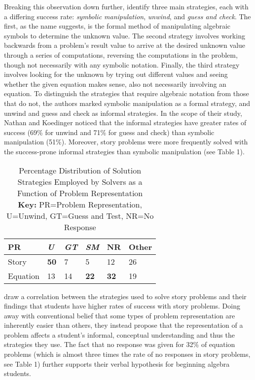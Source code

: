 \documentclass[10pt,letterpaper]{article}
\begin{document}
	Breaking this observation down further,  identify three main strategies, each with a differing success rate: \textit{symbolic manipulation}, \textit{unwind}, and \textit{guess and check}. The first, as the name suggests, is the formal method of manipulating algebraic symbols to determine the unknown value. The second strategy involves working backwards from a problem's result value to arrive at the desired unknown value through a series of computations, reversing the computations in the problem, though not necessarily with any symbolic notation. Finally, the third strategy involves looking for the unknown by trying out different values and seeing whether the given equation makes sense, also not necessarily involving an equation. To distinguish the strategies that require algebraic notation from those that do not, the authors marked symbolic manipulation as a formal strategy, and unwind and guess and check as informal strategies. In the scope of their study, Nathan and Koedinger noticed that the informal strategies have greater rates of success (69\% for unwind and 71\% for guess and check) than symbolic manipulation (51\%). Moreover, story problems were more frequently solved with the success-prone informal strategies than symbolic manipulation (see Table 1). %
	\begin{table}[!ht]
		\begin{center} 
			\label{strategies_employed} 
			\vskip 0.12in
			\begin{tabular}{llllll} 
				\hline
				PR    &  \textit{U} & \textit{GT} & \textit{SM} & NR & Other \\
				\hline
				Story        &   \textbf{50} & 7 & 5 & 12 & 26\\
				Equation   &   13 & 14 & \textbf{22} & \textbf{32} & 19 \\
				\hline
			\end{tabular} 
			\caption{Percentage Distribution of Solution Strategies Employed by Solvers as a Function of Problem Representation \cite{KoedNath2004}\\
			\textbf{Key:} PR=Problem Representation, U=Unwind, GT=Guess and Test, NR=No Response} 
		\end{center} 
	\end{table}
	
	 draw a correlation between the strategies used to solve story problems and their findings that students have higher rates of success with story problems. Doing away with conventional belief that some types of problem representation are inherently easier than others, they instead propose that the representation of a problem affects a student's informal, conceptual understanding and thus the strategies they use. The fact that no response was given for 32\% of equation problems (which is almost three times the rate of no responses in story problems, see Table 1) %
	further supports their verbal hypothesis for beginning algebra students.
	
\end{document}
